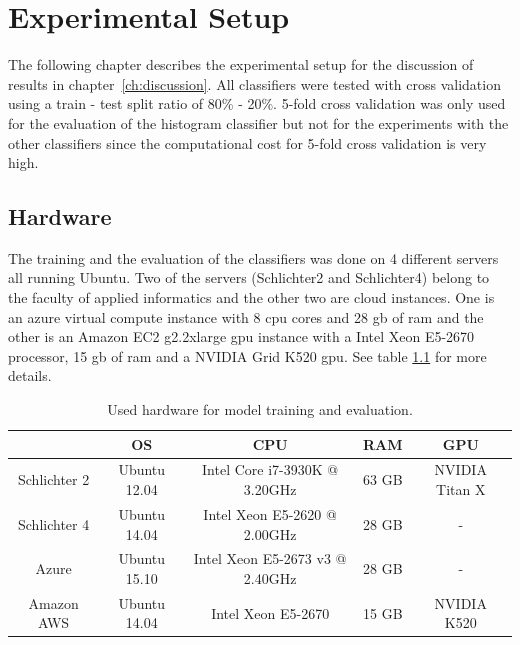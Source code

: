 
\chapter{Experimental Setup}
\label{ch:experimental_setup}

The following chapter describes the experimental setup for the discussion of results in chapter~\ref{ch:discussion}. All classifiers were tested with cross validation using a train - test split ratio of 80\% - 20\%. 5-fold cross validation was only used for the evaluation of the histogram classifier but not for the experiments with the other classifiers since the computational cost for 5-fold cross validation is very high.

\section{Hardware}
\label{sec:hardware}
The training and the evaluation of the classifiers was done on 4 different servers all running Ubuntu. Two of the servers {(Schlichter2 and Schlichter4)} belong to the faculty of applied informatics and the other two are cloud instances. One is an azure virtual compute instance with 8 \gls{cpu} cores and 28 \gls{gb} of \gls{ram} and the other is an Amazon EC2 g2.2xlarge \gls{gpu} instance with a Intel Xeon E5-2670 processor, 15 \gls{gb} of \gls{ram} and a NVIDIA Grid K520 \gls{gpu}. See table \ref{tab:usedHardware} for more details.
\begin{table}[hbt]
	\centering
	\caption{Used hardware for model training and evaluation.}
	\label{tab:usedHardware}
	\begin{tabular}{@{}ccccc@{}}
		\toprule
		\multicolumn{1}{c}{\textbf{}}    & \multicolumn{1}{c}{\textbf{OS}} & \multicolumn{1}{c}{\textbf{CPU}}                    & \multicolumn{1}{c}{\textbf{RAM}} & \multicolumn{1}{c}{\textbf{GPU}}     \\ \midrule
		Schlichter 2 & Ubuntu 12.04              & Intel Core i7-3930K @ 3.20GHz   & 63 GB        & NVIDIA Titan X \\ \midrule
		Schlichter 4 & Ubuntu 14.04              & Intel Xeon E5-2620 @ 2.00GHz    & 28 GB        & -                \\ \midrule
		Azure        & Ubuntu 15.10              & Intel Xeon E5-2673 v3 @ 2.40GHz & 28 GB        & -                \\ \midrule
		Amazon AWS   & Ubuntu 14.04              & Intel Xeon E5-2670              & 15 GB        & NVIDIA K520 \\ \bottomrule
	\end{tabular}
\end{table}

